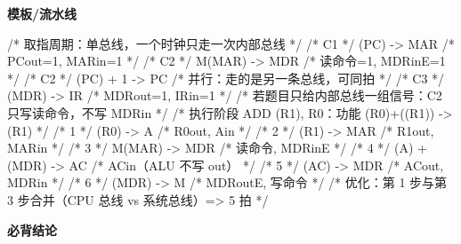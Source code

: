\documentclass[10pt,a4paper]{ctexart}
\begin{document}
\textbf{模板/流水线}

\begin{codebox}
/* 取指周期：单总线，一个时钟只走一次内部总线 */
/* C1 */ (PC) -> MAR       /* PCout=1, MARin=1              */
/* C2 */ M(MAR) -> MDR     /* 读命令=1, MDRinE=1            */
/* C2 */ (PC) + 1 -> PC    /* 并行：走的是另一条总线，可同拍 */
/* C3 */ (MDR) -> IR       /* MDRout=1, IRin=1              */
/* 若题目只给内部总线一组信号：C2 只写读命令，不写 MDRin */
/* 执行阶段 ADD (R1), R0：功能 (R0)+((R1)) -> (R1) */
/* 1 */ (R0) -> A           /* R0out, Ain                    */
/* 2 */ (R1) -> MAR         /* R1out, MARin                  */
/* 3 */ M(MAR) -> MDR       /* 读命令, MDRinE                */
/* 4 */ (A) + (MDR) -> AC   /* ACin（ALU 不写 out）          */
/* 5 */ (AC) -> MDR         /* ACout, MDRin                  */
/* 6 */ (MDR) -> M           /* MDRoutE, 写命令               */
/* 优化：第 1 步与第 3 步合并（CPU 总线 vs 系统总线）=> 5 拍 */
\end{codebox}




\textbf{必背结论}
\end{document}
